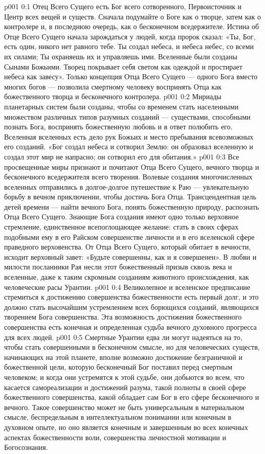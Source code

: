 \author{Божественный Советник}
\vs p001 0:1 Отец Всего Сущего есть Бог всего сотворенного, Первоисточник и Центр всех вещей и существ. Сначала подумайте о Боге как о творце, затем как о контролере и, в последнюю очередь, как о бесконечном вседержителе. Истина об Отце Всего Сущего начала зарождаться у людей, когда пророк сказал: «Ты, Бог, есть один, никого нет равного тебе. Ты создал небеса, и небеса небес, со всеми их силами; Ты охраняешь их и управляешь ими. Вселенные были созданы Сынами Божьими. Творец покрывает себя светом как одеждой и простирает небеса как завесу». Только концепция Отца Всего Сущего --- одного Бога вместо многих богов --- позволила смертному человеку воспринять Отца как божественного творца и бесконечного контролера.
\vs p001 0:2 Мириады планетарных систем были созданы, чтобы со временем стать населенными множеством различных типов разумных созданий --- существами, способными познать Бога, воспринять божественную любовь и в ответ полюбить его. Вселенная вселенных есть дело рук Божьих и место пребывания всевозможных его созданий. «Бог создал небеса и сотворил Землю: он образовал вселенную и создал этот мир не напрасно; он сотворил его для обитания.»
\vs p001 0:3 Все просвещенные миры признают и почитают Отца Всего Сущего, вечного творца и бесконечного вседержителя всего творения. Волевые создания многочисленных вселенных отправились в долгое\hyp{}долгое путешествие к Раю --- увлекательную борьбу в вечном приключении, чтобы достичь Бога Отца. Трансцендентная цель детей времени --- найти вечного Бога, понять божественную природу, распознать Отца Всего Сущего. Знающие Бога создания имеют одно только верховное стремление, единственное всепоглощающее желание: стать в своих сферах подобными ему в его Райском совершенстве личности и в его вселенской сфере праведного верховенства. От Отца Всего Сущего, который обитает в вечности, исходит верховный завет: «Будьте совершенны, как и я совершенен». В любви и милости посланники Рая несли этот божественный призыв сквозь века и вселенные, даже к таким скромным созданиям животного происхождения, как человеческие расы Урантии.
\vs p001 0:4 Великолепное и вселенское предписание стремиться к достижению совершенства божественности есть первый долг, и это должно стать высочайшим устремлением всех борющихся созданий, являющихся творением Бога совершенства. Эта возможность достижения божественного совершенства есть конечная и определенная судьба вечного духовного прогресса для всех людей.
\vs p001 0:5 Смертные Урантии едва ли могут надеяться на то, чтобы стать совершенными в бесконечном смысле, но для человеческих существ, начинающих на этой планете, вполне возможно достижение безграничной и божественной цели, которую бесконечный Бог поставил перед смертным человеком; и когда они устремятся к этой судьбе, они добьются во всем, что касается самореализации и достижений разума, такой полноты в своей сфере божественного совершенства, какой обладает сам Бог в его сфере бесконечного и вечного. Такое совершенство может не быть универсальным в материальном смысле, беспредельным в интеллектуальном понимании или конечным в духовном опыте, но оно является конечным и завершенным во всех конечных аспектах божественности воли, совершенства личностной мотивации и Богосознания.
